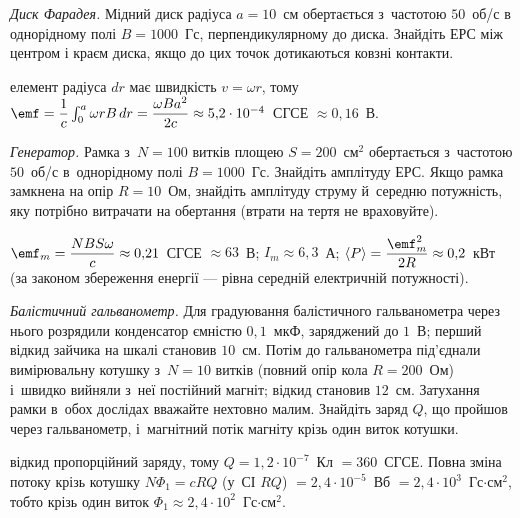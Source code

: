 \begin{problem}\label{prb:FaradayDisk}
	\emph{Диск Фарадея.} Мідний диск радіуса $a=10$~см обертається з~частотою $50$~об/с в
	однорідному полі $B=1000$~Гс, перпендикулярному до диска. Знайдіть ЕРС між центром і
	краєм диска, якщо до цих точок дотикаються ковзні контакти.
	\begin{solution}
		елемент
		радіуса $dr$ має швидкість $v=\omega r$, тому $\emf=\dfrac1c\int_0^a\omega
			rB\,dr=\dfrac{\omega Ba^2}{2c}\approx5{,}2\cdot10^{-4}$~СГСЕ $\approx0{,}16$~В.
	\end{solution}
\end{problem}

\begin{problem}\label{prb:GeneratorNumbers}
	\emph{Генератор.} Рамка з~$N=100$ витків площею $S=200$~см$^2$ обертається з~частотою
	$50$~об/с в~однорідному полі $B=1000$~Гс. Знайдіть амплітуду ЕРС. Якщо рамка замкнена
	на опір $R=10$~Ом, знайдіть амплітуду струму й~середню потужність, яку потрібно
	витрачати на обертання (втрати на тертя не враховуйте).
	\begin{solution}
		$\emf_m=\dfrac{NBS\omega}{c}\approx0{,}21$~СГСЕ $\approx63$~В; $I_m\approx6{,}3$~А;
		$\langle P\rangle=\dfrac{\emf_m^2}{2R}\approx0{,}2$~кВт (за законом збереження енергії
		--- рівна середній електричній потужності).
	\end{solution}
\end{problem}

\begin{problem}\label{prb:BallisticGalvanometerShort}
	\emph{Балістичний гальванометр.} Для градуювання балістичного гальванометра через нього розрядили конденсатор ємністю
	$0{,}1$~мкФ, заряджений до $1$~В; перший відкид зайчика на шкалі становив $10$~см. Потім до гальванометра під'єднали
	вимірювальну котушку з~$N=10$ витків (повний опір кола $R=200$~Ом) і~швидко вийняли з~неї постійний магніт; відкид становив
	$12$~см. Затухання рамки в~обох дослідах вважайте нехтовно малим. Знайдіть заряд $Q$, що пройшов через гальванометр, і~магнітний потік магніту крізь один виток котушки.
	\begin{solution}
		відкид пропорційний заряду, тому $Q = 1{,}2\cdot10^{-7}$~Кл $=360$~СГСЕ. Повна зміна потоку крізь котушку $N\Phi_1 = cRQ$ (у~СІ $RQ$) $= 2{,}4\cdot10^{-5}$~Вб $=2{,}4\cdot10^{3}$~Гс$\cdot$см$^2$, тобто крізь один виток $\Phi_1\approx2{,}4\cdot10^{2}$~Гс$\cdot$см$^2$.
	\end{solution}
\end{problem}

